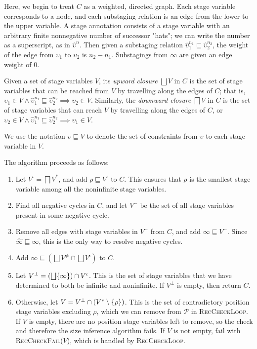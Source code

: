 \documentclass[sigplan,10pt,anonymous,review]{acmart}
\begin{document}
Here, we begin to treat $C$ as a weighted, directed graph. Each stage variable corresponds to a node, and each substaging relation is an edge from the lower to the upper variable. A stage annotation consists of a stage variable with an arbitrary finite nonnegative number of successor "hats"; we can write the number as a superscript, as in $\hat{\upsilon}^n$. Then given a substaging relation $\hat{\upsilon}_1^{n_1} \sqsubseteq \hat{\upsilon}_2^{n_2}$, the weight of the edge from $\upsilon_1$ to $\upsilon_2$ is $n_2 - n_1$. Substagings from $\infty$ are given an edge weight of $0$.

Given a set of stage variables $V$, its \textit{upward closure} $\bigsqcup V$ in $C$ is the set of stage variables that can be reached from $V$ by travelling along the edges of $C$; that is, $\upsilon_1 \in V \wedge \hat{\upsilon}_1^{n_1} \sqsubseteq \hat{\upsilon}_2^{n_2} \implies \upsilon_2 \in V$. Similarly, the \textit{downward closure} $\bigsqcap V$ in $C$ is the set of stage variables that can reach $V$ by travelling along the edges of $C$, or $\upsilon_2 \in V \wedge \hat{\upsilon}_1^{n_1} \sqsubseteq \hat{\upsilon}_2^{n_2} \implies \upsilon_1 \in V$.

We use the notation $\upsilon \sqsubseteq V$ to denote the set of constraints from $\upsilon$ to each stage variable in $V$.

The algorithm proceeds as follows:

\begin{enumerate}
    \item Let $V^\iota = \bigsqcap V^*$, and add $\rho \sqsubseteq V^\iota$ to $C$. This ensures that $\rho$ is the smallest stage variable among all the noninfinite stage variables.
    \item Find all negative cycles in $C$, and let $V^-$ be the set of all stage variables present in some negative cycle.
    \item Remove all edges with stage variables in $V^-$ from $C$, and add $\infty \sqsubseteq V^-$. Since $\widehat{\infty} \sqsubseteq \infty$, this is the only way to resolve negative cycles.
    \item Add $\infty \sqsubseteq \left(\bigsqcup V^\neq \cap \bigsqcup V^\iota\right)$ to $C$.
    \item Let $V^\bot = \left(\bigsqcup \{\infty\}\right) \cap V^\iota$. This is the set of stage variables that we have determined to both be infinite and noninfinite. If $V^\bot$ is empty, then return $C$.
    \item Otherwise, let $V = V^\bot \cap (V^* \setminus \{\rho\})$. This is the set of contradictory position stage variables excluding $\rho$, which we can remove from $\mathcal{P}$ in \textsc{RecCheckLoop}. If $V$ is empty, there are no position stage variables left to remove, so the check and therefore the size inference algorithm fails. If $V$ is not empty, fail with \textsc{RecCheckFail}($V$), which is handled by \textsc{RecCheckLoop}.
\end{enumerate}
\end{document}

